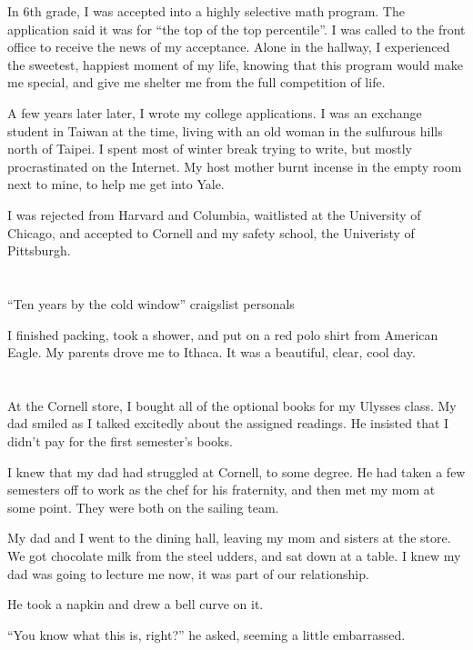 In 6th grade, I was accepted into a highly selective math program.  The
application said it was for ``the top of the top percentile''.  I was called to
the front office to receive the news of my acceptance.  Alone in the hallway, I
experienced the sweetest, happiest moment of my life, knowing that this program
would make me special, and give me shelter me from the full competition of life.

A few years later later, I wrote my college applications.  I was an exchange
student in Taiwan at the time, living with an old woman in the sulfurous hills
north of Taipei.  I spent most of winter break trying to write, but mostly
procrastinated on the Internet.  My host mother burnt incense in the empty room
next to mine, to help me get into Yale.  

I was rejected from Harvard and Columbia, waitlisted at the University of
Chicago, and accepted to Cornell and my safety school, the Univeristy of
Pittsburgh.  

\section{}

``Ten years by the cold window''
craigslist personals

I finished packing, took a shower, and put on a red polo shirt from
American Eagle.  My parents drove me to Ithaca.  It was a beautiful, clear, cool
day.  

\section{}

At the Cornell store, I bought all of the optional books for my Ulysses class.
My dad smiled as I talked excitedly about the assigned readings.  He insisted
that I didn't pay for the first semester's books.

I knew that my dad had struggled at Cornell, to some degree.  He had taken a few
semesters off to work as the chef for his fraternity, and then met my mom at
some point.  They were both on the sailing team.

My dad and I went to the dining hall, leaving my mom and sisters at the store.
We got chocolate milk from the steel udders, and sat down at a table.  I knew my
dad was going to lecture me now, it was part of our relationship. 

He took a napkin and drew a bell curve on it.

``You know what this is, right?'' he asked, seeming a little embarrassed.

